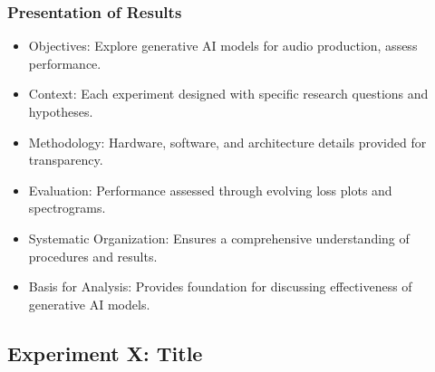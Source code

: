 \begin{frame}
    \frametitle{Presentation of Results}

    \begin{itemize}
        \item Objectives: Explore generative AI models for audio production, assess performance.
        \item Context: Each experiment designed with specific research questions and hypotheses.
        \item Methodology: Hardware, software, and architecture details provided for transparency.
        \item Evaluation: Performance assessed through evolving loss plots and spectrograms.
        \item Systematic Organization: Ensures a comprehensive understanding of procedures and results.
        \item Basis for Analysis: Provides foundation for discussing effectiveness of generative AI models.
    \end{itemize}
\end{frame}

\subsection{Experiment X: Title} \label{sec:expX}

